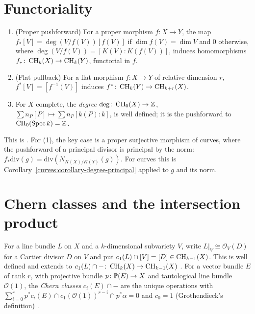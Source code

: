 \section{Functoriality}\label{intersection-theory:section-functoriality}

\begin{theorem}\label{intersection-theory:theorem-functoriality}
\begin{enumerate}
\item (Proper pushforward) For a proper morphism $f \colon X \to Y$, the map $f_*[V] = \deg(V/f(V))[f(V)]$ if $\dim f(V) = \dim V$ and $0$ otherwise, where
$\deg(V/f(V)) = [K(V) : K(f(V))]$, induces homomorphisms $f_* \colon \operatorname{CH}_k(X) \to \operatorname{CH}_k(Y)$, functorial in $f$.
\item (Flat pullback) For a flat morphism $f \colon X \to Y$ of relative dimension $r$, $f^*[V] = [f^{-1}(V)]$ induces $f^* \colon \operatorname{CH}_k(Y) \to \operatorname{CH}_{k+r}(X)$.
\item For $X$ complete, the \emph{degree} $\deg \colon \operatorname{CH}_0(X) \to \mathbb{Z}$, $\sum n_P[P] \mapsto \sum n_P[k(P) : k]$, is well defined; it is the pushforward to $\operatorname{CH}_0(\operatorname{Spec} k) = \mathbb{Z}$.
\end{enumerate}
\end{theorem}

This is \cite[Theorem 1.4 and Theorem 1.7]{fulton-intersection}. For (1), the key case is a proper surjective morphism of curves, where the pushforward of a principal divisor is principal
by the norm: $f_*\mathrm{div}(g) = \mathrm{div}(N_{K(X)/K(Y)}(g))$. For curves this is Corollary~\ref{curves:corollary-degree-principal} applied to $g$ and its norm.

\section{Chern classes and the intersection product}\label{intersection-theory:section-intersection-product}

\begin{definition}\label{intersection-theory:definition-chern-classes}
For a line bundle $L$ on $X$ and a $k$-dimensional subvariety $V$, write $L|_V \cong \mathcal{O}_V(D)$ for a Cartier divisor $D$ on $V$ and put $c_1(L) \cap [V] = [D] \in \operatorname{CH}_{k-1}(X)$. This
is well defined and extends to $c_1(L) \cap - \colon \operatorname{CH}_k(X) \to \operatorname{CH}_{k-1}(X)$ \cite[Chapter 2]{fulton-intersection}. For a vector bundle $E$ of rank $r$, with projective bundle
$p \colon \mathbb{P}(E) \to X$ and tautological line bundle $\mathcal{O}(1)$, the \emph{Chern classes} $c_i(E) \cap -$ are the unique operations with
$\sum_{i=0}^r p^*c_i(E) \cap c_1(\mathcal{O}(1))^{r-i} \cap p^*\alpha = 0$ and $c_0 = 1$ (Grothendieck's definition) \cite[Chapter 3]{fulton-intersection}.
\end{definition}

